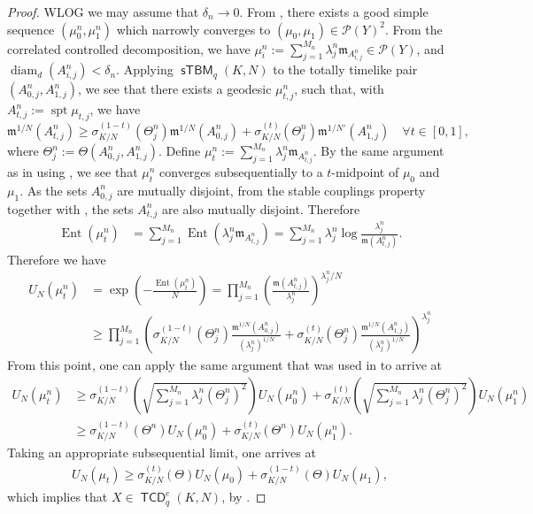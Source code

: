 \documentclass{article}
\newcommand{\m}{\mathfrak{m}}
\DeclareMathOperator{\spt}{spt}
\DeclareMathOperator{\diam}{diam}
\newcommand{\Pcal}{\mathcal{P}}
\DeclareMathOperator{\TCD}{\mathsf{TCD}}
\DeclareMathOperator{\sTBM}{\mathsf{sTBM}}
\DeclareMathOperator{\Ent}{Ent}
\theoremstyle{definition}
\begin{document}
{\begin{proof}
WLOG we may assume that $\delta_n\to 0$. 
From , there exists a good simple sequence $(\mu_0^n, \mu_1^n)$ which narrowly converges to $(\mu_0, \mu_1)\in \Pcal(Y)^2$. From the correlated controlled decomposition, we have  $\mu_i^n:= \sum_{j=1}^{M_n} \lambda_j^n\m_{A_{i,j}^n}\in \Pcal(Y)$, and $\diam_d(A_{i,j}^n)<\delta_n$. Applying $\sTBM_q(K,N)$ to the totally timelike pair $(A_{0,j}^n, A_{1,j}^n)$, we see that there exists a geodesic $\mu_{t,j}^n$, such that, with $A_{t,j}^n:= \spt\mu_{t,j}$, we have 
\[\m^{1/N}(A_{t,j}^n)\geq \sigma_{K/N}^{(1-t)}(\Theta_j^n) \m^{1/N}(A_{0,j}^n)+\sigma_{K/N}^{(t)}(\Theta_j^n)\m^{1/N'}(A_{1,j}^n)\quad \forall t\in [0,1], \]
where $\Theta_j^n:=\Theta(A_{0,j}^n, A_{1,j}^n)$. Define $\mu_t^n:= \sum_{j=1}^{M_n} \lambda_j^n \m_{A_{t,j}^n}$. By the same argument as in  using , we see that $\mu_t^n$ converges subsequentially to a $t$-midpoint of $\mu_0$ and $\mu_1$. As the sets $A_{0,j}^n$ are mutually disjoint, from the stable couplings property together with , the sets $A_{t,j}^n$ are also mutually disjoint. Therefore 
\begin{align*}
\Ent(\mu_t^n) &=\sum_{j=1}^{M_n} \Ent(\lambda_j^n\m_{A_{t,j}^n}) = \sum_{j=1}^{M_n} \lambda_j^n\log\frac{\lambda_j^n}{\m(A_{t,j}^n)}.
\end{align*}
Therefore we have 
\begin{align*}
U_N(\mu_t^n) &=\exp\left(-\frac{\Ent(\mu_t^n)}{N}\right) =\prod_{j=1}^{M_n} \left(\frac{\m(A_{t,j}^n)}{\lambda_j^n}\right)^{\lambda_j^n/N}\\
& \geq \prod_{j=1}^{M_n}\left(\sigma_{K/N}^{(1-t)}(\Theta_j^n)\frac{\m^{1/N}(A_{0,j}^n)}{(\lambda_j^n)^{1/N}}+\sigma_{K/N}^{(t)}(\Theta_j^n)\frac{\m^{1/N}(A_{1,j}^n)}{(\lambda_j^n)^{1/N}}\right)^{\lambda_j^n }
\end{align*}
From this point, one can apply the same argument that was used in  to arrive at
\begin{align*}
U_N(\mu_t^n) &\geq  \sigma_{K/N}^{(1-t)}\left( \sqrt{\sum_{j=1}^{M_n} \lambda_j^n(\Theta_j^n)^2}\right)U_N(\mu_0^n)+\sigma_{K/N}^{(t)}\left(\sqrt{\sum_{j=1}^{M_n} \lambda_j^n(\Theta_j^n)^2}\right)U_N(\mu_1^n)\\
&\geq \sigma_{K/N}^{(1-t)}\left( \Theta^n\right)U_N(\mu_0^n)+\sigma_{K/N}^{(t)}\left(\Theta^n\right)U_N(\mu_1^n).
\end{align*}
Taking an appropriate subsequential limit, one arrives at 
\begin{align*}
U_N(\mu_t)\geq \sigma_{K/N}^{(t)}(\Theta)U_N(\mu_0)+\sigma_{K/N}^{(1-t)}(\Theta)U_N(\mu_1),
\end{align*}
which implies that $X\in \TCD_q^e(K,N)$, by .
\end{proof}

}
\end{document}
